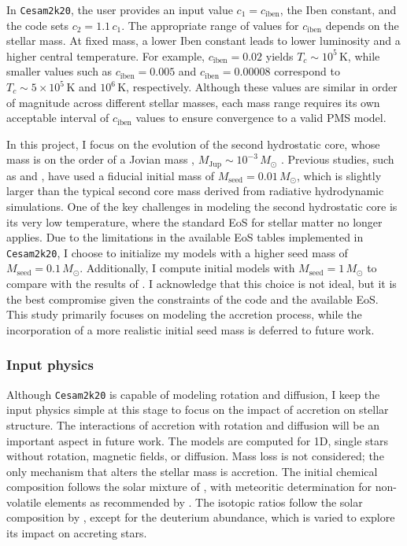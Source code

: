 \documentclass[12pt,a4paper]{article}
\newcommand{\mr}{\mathrm}
\begin{document}
In \texttt{Cesam2k20}, the user provides an input value $c_1 = c_\mr{iben}$, the Iben constant, and the code sets $c_2 = 1.1\,c_1$. The appropriate range of values for $c_\mr{iben}$ depends on the stellar mass. At fixed mass, a lower Iben constant leads to lower luminosity and a higher central temperature. For example, $c_\mr{iben} = 0.02$ yields $T_c \sim 10^5\,\mr{K}$, while smaller values such as $c_\mr{iben} = 0.005$ and $c_\mr{iben} = 0.00008$ correspond to $T_c \sim 5 \times 10^5\,\mr{K}$ and $10^6\,\mr{K}$, respectively. Although these values are similar in order of magnitude across different stellar masses, each mass range requires its own acceptable interval of $c_\mr{iben}$ values to ensure convergence to a valid PMS model.  

In this project, I focus on the evolution of the second hydrostatic core, whose mass is on the order of a Jovian mass , $M_\mr{Jup} \sim 10^{-3}\,M_\odot$ \parencite[e.g.,][]{VaytetEtAl2013}. Previous studies, such as \textcite{KunitomoEtAl2017} and \textcite{AmardMatt2023}, have used a fiducial initial mass of $M_\mr{seed} = 0.01\,M_\odot$, which is slightly larger than the typical second core mass derived from radiative hydrodynamic simulations. One of the key challenges in modeling the second hydrostatic core is its very low temperature, where the standard EoS for stellar matter no longer applies. Due to the limitations in the available EoS tables implemented in \texttt{Cesam2k20}, I choose to initialize my models with a higher seed mass of $M_\mr{seed} = 0.1\,M_\odot$. Additionally, I compute initial models with $M_\mr{seed} = 1\,M_\odot$ to compare with the results of \textcite{PallaStahler1993}. I acknowledge that this choice is not ideal, but it is the best compromise given the constraints of the code and the available EoS. This study primarily focuses on modeling the accretion process, while the incorporation of a more realistic initial seed mass is deferred to future work.

\subsubsection{Input physics}
\label{sec:cesam2k20_input_physics}

Although \texttt{Cesam2k20} is capable of modeling rotation and diffusion, I keep the input physics simple at this stage to focus on the impact of accretion on stellar structure. The interactions of accretion with rotation and diffusion will be an important aspect in future work. The models are computed for 1D, single stars without rotation, magnetic fields, or diffusion. Mass loss is not considered; the only mechanism that alters the stellar mass is accretion. The initial chemical composition follows the solar mixture of \textcite{AsplundEtAl2009}, with meteoritic determination for non-volatile elements as recommended by \textcite{SerenelliEtAl2009}. The isotopic ratios follow the solar composition by \textcite{AsplundEtAl2021}, except for the deuterium abundance, which is varied to explore its impact on accreting stars.
\end{document}
